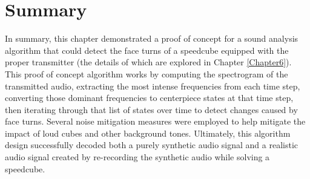 \section{Summary}

In summary, this chapter demonstrated a proof of concept for a sound
analysis algorithm that could detect the face turns of a speedcube
equipped with the proper transmitter (the details of which are explored
in Chapter \ref{Chapter6}). This proof of concept algorithm works by
computing the spectrogram of the transmitted audio, extracting the most
intense frequencies from each time step, converting those dominant
frequencies to centerpiece states at that time step, then iterating
through that list of states over time to detect changes caused by face
turns. Several noise mitigation measures were employed to help mitigate
the impact of loud cubes and other background tones. Ultimately, this
algorithm design successfully decoded both a purely synthetic audio
signal and a realistic audio signal created by re-recording the
synthetic audio while solving a speedcube.
